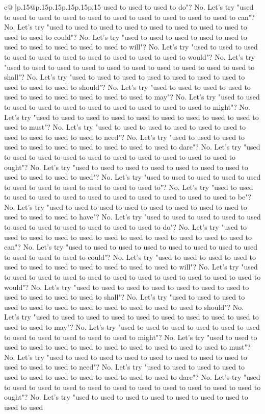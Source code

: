 \documentclass{article}
\begin{document}
{\begin{supertabular}{c@{$\;$}|p{.15\linewidth}@{}p{.15\linewidth}p{.15\linewidth}p{.15\linewidth}p{.15\linewidth}p{.15\linewidth}}
{{{used to used to used to do"? No. Let's try "used to used to used to used to used to used to used to used to used to used to can"? No. Let's try "used to used to used to used to used to used to used to used to used to used to could"? No. Let's try "used to used to used to used to used to used to used to used to used to used to will"? No. Let's try "used to used to used to used to used to used to used to used to used to used to would"? No. Let's try "used to used to used to used to used to used to used to used to used to used to shall"? No. Let's try "used to used to used to used to used to used to used to used to used to used to should"? No. Let's try "used to used to used to used to used to used to used to used to used to used to may"? No. Let's try "used to used to used to used to used to used to used to used to used to used to might"? No. Let's try "used to used to used to used to used to used to used to used to used to used to must"? No. Let's try "used to used to used to used to used to used to used to used to used to used to need"? No. Let's try "used to used to used to used to used to used to used to used to used to used to dare"? No. Let's try "used to used to used to used to used to used to used to used to used to used to ought"? No. Let's try "used to used to used to used to used to used to used to used to used to used to used"? No. Let's try "used to used to used to used to used to used to used to used to used to used to used to"? No. Let's try "used to used to used to used to used to used to used to used to used to used to used to be"? No. Let's try "used to used to used to used to used to used to used to used to used to used to used to have"? No. Let's try "used to used to used to used to used to used to used to used to used to used to used to do"? No. Let's try "used to used to used to used to used to used to used to used to used to used to used to can"? No. Let's try "used to used to used to used to used to used to used to used to used to used to used to could"? No. Let's try "used to used to used to used to used to used to used to used to used to used to used to will"? No. Let's try "used to used to used to used to used to used to used to used to used to used to used to would"? No. Let's try "used to used to used to used to used to used to used to used to used to used to used to shall"? No. Let's try "used to used to used to used to used to used to used to used to used to used to used to should"? No. Let's try "used to used to used to used to used to used to used to used to used to used to used to may"? No. Let's try "used to used to used to used to used to used to used to used to used to used to used to might"? No. Let's try "used to used to used to used to used to used to used to used to used to used to used to must"? No. Let's try "used to used to used to used to used to used to used to used to used to used to used to need"? No. Let's try "used to used to used to used to used to used to used to used to used to used to used to dare"? No. Let's try "used to used to used to used to used to used to used to used to used to used to used to ought"? No. Let's try "used to used to used to used to used to used to used to used to used }}}
\end{supertabular}}
\end{document}
